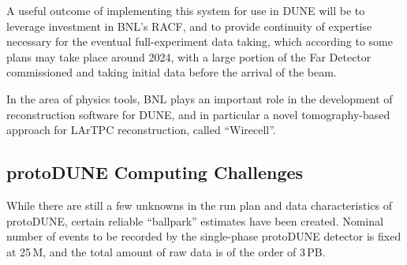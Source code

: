 \documentclass[pdftex,12pt,letter]{article}
\begin{document}
A useful outcome of implementing this system for use in DUNE will be to leverage
investment in BNL's RACF, and to
provide continuity of expertise necessary for the eventual
full-experiment data taking, which according to some plans may take
place around 2024, with a large portion of the Far Detector
commissioned and taking initial data before the arrival of the beam.

In the area of physics tools, BNL plays an important role in the development of reconstruction software for DUNE, and
in particular a novel tomography-based approach for LArTPC reconstruction, called ``Wirecell''.


\subsection{protoDUNE Computing Challenges}
While there are still a few unknowns in the run plan and data characteristics of protoDUNE, certain
reliable ``ballpark'' estimates have been created. Nominal number of events to be recorded by the single-phase
protoDUNE detector is fixed at 25\,M, and the total amount of raw data is of the order of 3\,PB.
\end{document}
